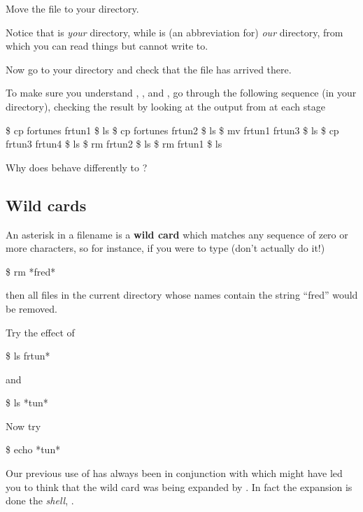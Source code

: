 Move the file  to your  directory.

Notice that \fname{\crsname} is \emph{your\/} \crsname{} directory, while
\fname{\Dcrsname} is (an abbreviation for) \emph{our\/} \crsname{}
directory, from which you can read things but cannot write to.

Now go to your  directory and check that the file
has arrived there.

To make sure you understand , , and
, go through the following sequence (in your
 directory), checking the result by looking at the
output from  at each stage

\begin{ttoutenv}
\$  cp fortunes frtun1 \return
\$  ls \return
\$  cp fortunes frtun2 \return
\$  ls \return
\$  mv frtun1 frtun3 \return
\$  ls \return
\$  cp frtun3 frtun4 \return
\$  ls \return
\$  rm frtun2 \return
\$  ls \return
\$  rm frtun1 \return
\$  ls \return
\end{ttoutenv}
Why does  behave differently to ?

\subsection{Wild cards}
An asterisk in a filename is a \textbf{wild card} which matches any sequence of
zero or more characters, so for instance, if you were to type (don't
actually do it!)
%
\begin{ttoutenv}
\$  rm *fred*\return
\end{ttoutenv}
%
then all files in the current directory whose names contain the string
``fred'' would be removed.

Try the effect of
%
\begin{ttoutenv}
\$  ls frtun*\return
\end{ttoutenv}
%
and
%
\begin{ttoutenv}
\$  ls *tun*\return
\end{ttoutenv}

Now try
%
\begin{ttoutenv}
\$  echo *tun*\return
\end{ttoutenv}
%
Our previous use of \ttout{*} has always been in conjunction with  which might have led you to think that the wild card was being expanded by . In fact the expansion is done the \emph{shell}, .

